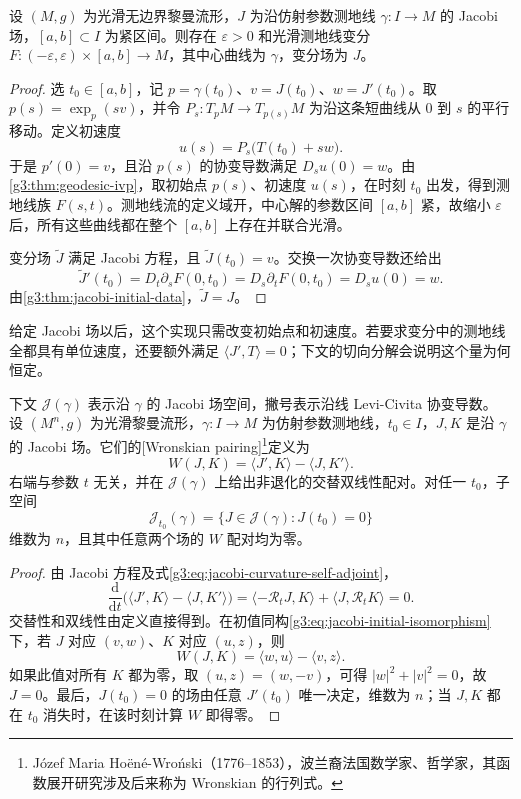 \begin{proposition}\label{g3:prop:jacobi-geodesic-variation}
	设 \((M,g)\) 为光滑无边界黎曼流形，\(J\) 为沿仿射参数测地线 \(\gamma:I\to M\) 的 Jacobi 场，\([a,b]\subset I\) 为紧区间。则存在 \(\varepsilon>0\) 和光滑测地线变分 \(F:(-\varepsilon,\varepsilon)\times[a,b]\to M\)，其中心曲线为 \(\gamma\)，变分场为 \(J\)。
\end{proposition}
\begin{proof}
	选 \(t_0\in[a,b]\)，记 \(p=\gamma(t_0)\)、\(v=J(t_0)\)、\(w=J'(t_0)\)。取 \(p(s)=\exp_p(sv)\)，并令 \(P_s:T_pM\to T_{p(s)}M\) 为沿这条短曲线从 \(0\) 到 \(s\) 的平行移动。定义初速度
	\[
		u(s)=P_s\bigl(T(t_0)+sw\bigr).
	\]
	于是 \(p'(0)=v\)，且沿 \(p(s)\) 的协变导数满足 \(D_su(0)=w\)。由\cref{g3:thm:geodesic-ivp}，取初始点 \(p(s)\)、初速度 \(u(s)\)，在时刻 \(t_0\) 出发，得到测地线族 \(F(s,t)\)。测地线流的定义域开，中心解的参数区间 \([a,b]\) 紧，故缩小 \(\varepsilon\) 后，所有这些曲线都在整个 \([a,b]\) 上存在并联合光滑。

	变分场 \(\widetilde J\) 满足 Jacobi 方程，且 \(\widetilde J(t_0)=v\)。交换一次协变导数还给出
	\[
		\widetilde J'(t_0)
		=D_t\partial_sF(0,t_0)
		=D_s\partial_tF(0,t_0)=D_su(0)=w.
	\]
	由\cref{g3:thm:jacobi-initial-data}，\(\widetilde J=J\)。
\end{proof}

给定 Jacobi 场以后，这个实现只需改变初始点和初速度。若要求变分中的测地线全都具有单位速度，还要额外满足 \(\langle J',T\rangle=0\)；下文的切向分解会说明这个量为何恒定。

\begin{proposition}\label{g3:prop:jacobi-wronskian}
	下文 \(\mathcal J(\gamma)\) 表示沿 \(\gamma\) 的 Jacobi 场空间，撇号表示沿线 Levi-Civita 协变导数。
	设 \((M^n,g)\) 为光滑黎曼流形，\(\gamma:I\to M\) 为仿射参数测地线，\(t_0\in I\)，\(J,K\) 是沿 \(\gamma\) 的 Jacobi 场。它们的[Wronskian pairing]\footnote{Józef Maria Hoëné-Wroński（1776--1853），波兰裔法国数学家、哲学家，其函数展开研究涉及后来称为 Wronskian 的行列式。}定义为
	\begin{equation}\label{g3:eq:jacobi-wronskian}
		W(J,K)=\langle J',K\rangle-\langle J,K'\rangle.
	\end{equation}
	右端与参数 \(t\) 无关，并在 \(\mathcal J(\gamma)\) 上给出非退化的交替双线性配对。对任一 \(t_0\)，子空间
	\[
		\mathcal J_{t_0}(\gamma)=\{J\in\mathcal J(\gamma):J(t_0)=0\}
	\]
	维数为 \(n\)，且其中任意两个场的 \(W\) 配对均为零。
\end{proposition}
\begin{proof}
	由 Jacobi 方程及式\eqref{g3:eq:jacobi-curvature-self-adjoint}，
	\[
		\frac{\mathrm d}{\mathrm dt}
		\bigl(\langle J',K\rangle-\langle J,K'\rangle\bigr)
		=\langle-\mathcal R_tJ,K\rangle+\langle J,\mathcal R_tK\rangle=0.
	\]
	交替性和双线性由定义直接得到。在初值同构\eqref{g3:eq:jacobi-initial-isomorphism}下，若 \(J\) 对应 \((v,w)\)、\(K\) 对应 \((u,z)\)，则
	\[
		W(J,K)=\langle w,u\rangle-\langle v,z\rangle.
	\]
	如果此值对所有 \(K\) 都为零，取 \((u,z)=(w,-v)\)，可得 \(|w|^2+|v|^2=0\)，故 \(J=0\)。最后，\(J(t_0)=0\) 的场由任意 \(J'(t_0)\) 唯一决定，维数为 \(n\)；当 \(J,K\) 都在 \(t_0\) 消失时，在该时刻计算 \(W\) 即得零。
\end{proof}

